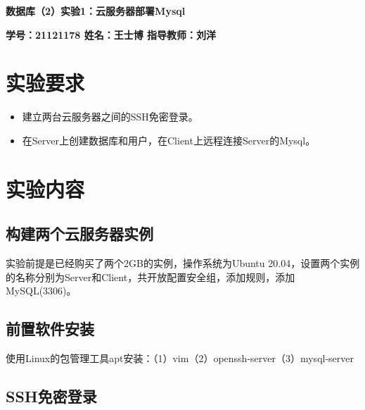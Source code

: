 \documentclass{ctexart}
\begin{document}
 \pingfang
\begin{center}
    \textbf{\huge 数据库（2）实验1：云服务器部署Mysql}
\end{center}
\begin{center}
    \textbf{\large \textbf{学号：21121178 \quad 姓名：王士博 \quad 指导教师：刘洋}}
\end{center}
\hrulefill
\section{实验要求}
\begin{itemize}
  \item 建立两台云服务器之间的SSH免密登录。
  \item 在Server上创建数据库和用户，在Client上远程连接Server的Mysql。
\end{itemize}
\section{实验内容}
\subsection{构建两个云服务器实例}
实验前提是已经购买了两个2GB的实例，操作系统为Ubuntu 20.04，设置两个实例的名称分别为Server和Client，共开放配置安全组，添加规则，添加MySQL(3306)。
\subsection{前置软件安装}
\indent 使用Linux的包管理工具apt安装：（1）vim（2）openssh-server（3）mysql-server
\subsection{SSH免密登录}
\end{document}
